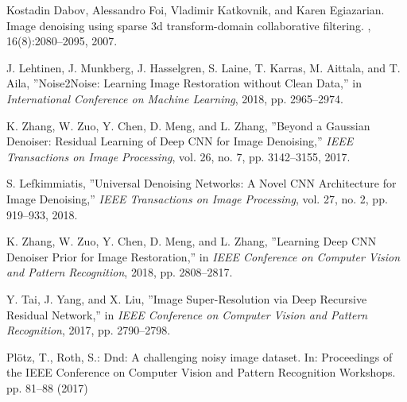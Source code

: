\documentclass[a4paper,
               ]{jacow}
\begin{document}
{\begin{thebibliography}{9}
        Kostadin Dabov, Alessandro Foi, Vladimir Katkovnik, and Karen Egiazarian.
        \newblock Image denoising using sparse 3d transform-domain collaborative filtering.
        , 16(8):2080--2095, 2007.

        J. Lehtinen, J. Munkberg, J. Hasselgren, S. Laine, T. Karras, M. Aittala, and T. Aila,
        ''Noise2Noise: Learning Image Restoration without Clean Data,''
        in \emph{International Conference on Machine Learning}, 2018, pp. 2965--2974.

        K. Zhang, W. Zuo, Y. Chen, D. Meng, and L. Zhang,
        ''Beyond a Gaussian Denoiser: Residual Learning of Deep CNN for Image Denoising,''
        \emph{IEEE Transactions on Image Processing}, vol. 26, no. 7, pp. 3142--3155, 2017.

        S. Lefkimmiatis,
        ''Universal Denoising Networks: A Novel CNN Architecture for Image Denoising,''
        \emph{IEEE Transactions on Image Processing}, vol. 27, no. 2, pp. 919--933, 2018.

        K. Zhang, W. Zuo, Y. Chen, D. Meng, and L. Zhang,
        ''Learning Deep CNN Denoiser Prior for Image Restoration,''
        in \emph{IEEE Conference on Computer Vision and Pattern Recognition}, 2018, pp. 2808--2817.

        Y. Tai, J. Yang, and X. Liu,
        ''Image Super-Resolution via Deep Recursive Residual Network,''
        in \emph{IEEE Conference on Computer Vision and Pattern Recognition}, 2017, pp. 2790--2798.

        Plötz, T., Roth, S.: Dnd: A challenging noisy image dataset. In: Proceedings of the IEEE Conference on Computer Vision and Pattern Recognition Workshops. pp. 81–88 (2017)
	\end{thebibliography}
} %
%
%

\end{document}
